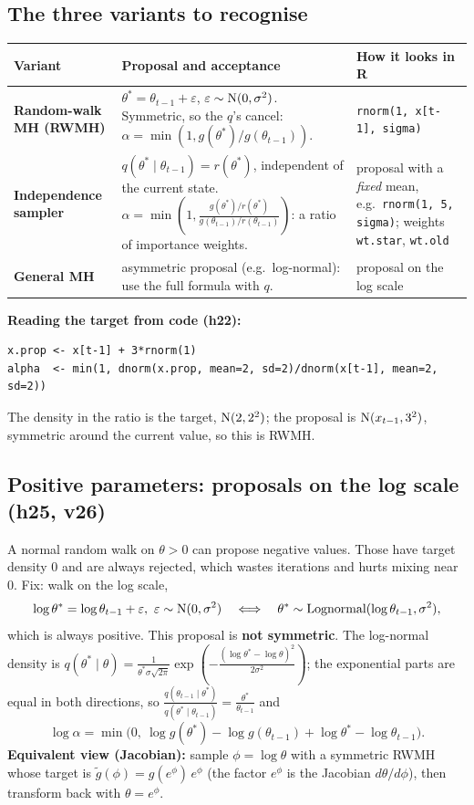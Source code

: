 \subsection{The three variants to recognise}
\begin{center}
\begin{tabularx}{\textwidth}{>{\raggedright\arraybackslash}p{}>{\raggedright\arraybackslash}X>{\raggedright\arraybackslash}p{}}
\toprule
Variant & Proposal and acceptance & How it looks in R \\
\midrule
\textbf{Random-walk MH (RWMH)} & $\theta^* = \theta_{t-1}+\varepsilon$, $\varepsilon\sim\mathrm{N}(0,\sigma^2)$. Symmetric, so the $q$'s cancel: $\alpha = \min(1, g(\theta^*)/g(\theta_{t-1}))$. & \texttt{rnorm(1, x[t-1], sigma)} \\
\textbf{Independence sampler} & $q(\theta^*\mid\theta_{t-1}) = r(\theta^*)$, independent of the current state. $\alpha = \min\left(1,\frac{g(\theta^*)/r(\theta^*)}{g(\theta_{t-1})/r(\theta_{t-1})}\right)$: a ratio of importance weights. & proposal with a \emph{fixed} mean, e.g.\ \texttt{rnorm(1, 5, sigma)}; weights \texttt{wt.star}, \texttt{wt.old} \\
\textbf{General MH} & asymmetric proposal (e.g.\ log-normal): use the full formula with $q$. & proposal on the log scale \\
\bottomrule
\end{tabularx}
\end{center}
\textbf{Reading the target from code (h22):}
\begin{Verbatim}
x.prop <- x[t-1] + 3*rnorm(1)
alpha  <- min(1, dnorm(x.prop, mean=2, sd=2)/dnorm(x[t-1], mean=2, sd=2))
\end{Verbatim}
The density in the ratio is the target, $\mathrm{N}(2,2^2)$; the proposal is $\mathrm{N}(x_{t-1},3^2)$, symmetric around the current value, so this is RWMH.

\subsection{Positive parameters: proposals on the log scale (h25, v26)}
A normal random walk on $\theta>0$ can propose negative values. Those have target density 0 and are always rejected, which wastes iterations and hurts mixing near 0. Fix: walk on the log scale,
\[
\log\theta^* = \log\theta_{t-1}+\varepsilon,\ \varepsilon\sim\N(0,\sigma^2)\quad\Longleftrightarrow\quad\theta^*\sim\text{Lognormal}(\log\theta_{t-1},\sigma^2),
\]
which is always positive. This proposal is \textbf{not symmetric}. The log-normal density is $q(\theta^*\mid\theta) = \frac{1}{\theta^*\sigma\sqrt{2\pi}}\exp\left(-\frac{(\log\theta^*-\log\theta)^2}{2\sigma^2}\right)$; the exponential parts are equal in both directions, so $\frac{q(\theta_{t-1}\mid\theta^*)}{q(\theta^*\mid\theta_{t-1})} = \frac{\theta^*}{\theta_{t-1}}$ and
\[
\log\alpha = \min\Big(0,\ \log g(\theta^*)-\log g(\theta_{t-1})+\log\theta^*-\log\theta_{t-1}\Big).
\]
\textbf{Equivalent view (Jacobian):} sample $\phi = \log\theta$ with a symmetric RWMH whose target is $\tilde g(\phi) = g(e^\phi)\,e^\phi$ (the factor $e^\phi$ is the Jacobian $d\theta/d\phi$), then transform back with $\theta = e^\phi$.

